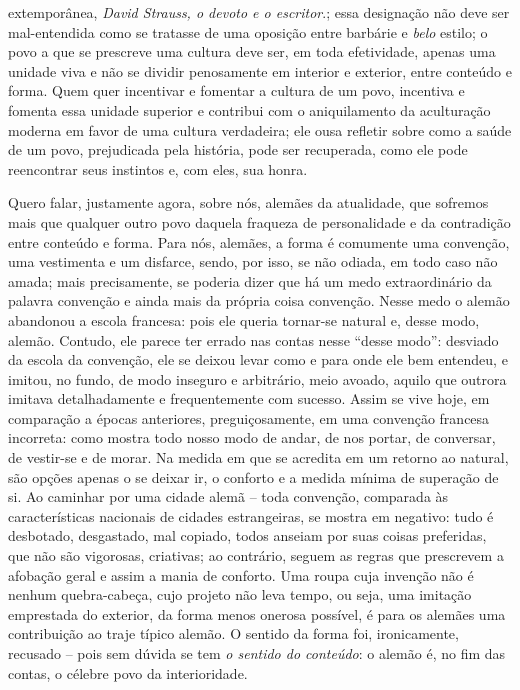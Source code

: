 \begin{enumerate}
\begin{enumerate}
{      extemporânea, \emph{David Strauss, o devoto e o escritor}.}; essa
    designação não deve ser mal-entendida como se tratasse de uma
    oposição entre barbárie e \emph{belo} estilo; o povo a que se
    prescreve uma cultura deve ser, em toda efetividade, apenas uma
    unidade viva e não se dividir penosamente em interior e exterior,
    entre conteúdo e forma. Quem quer incentivar e fomentar a cultura de
    um povo, incentiva e fomenta essa unidade superior e contribui com o
    aniquilamento da aculturação moderna em favor de uma cultura
    verdadeira; ele ousa refletir sobre como a saúde de um povo,
    prejudicada pela história, pode ser recuperada, como ele pode
    reencontrar seus instintos e, com eles, sua honra.

    Quero falar, justamente agora, sobre nós, alemães da atualidade, que
    sofremos mais que qualquer outro povo daquela fraqueza de
    personalidade e da contradição entre conteúdo e forma. Para nós,
    alemães, a forma é comumente uma convenção, uma vestimenta e um
    disfarce, sendo, por isso, se não odiada, em todo caso não amada;
    mais precisamente, se poderia dizer que há um medo extraordinário da
    palavra convenção e ainda mais da própria coisa convenção. Nesse
    medo o alemão abandonou a escola francesa: pois ele queria tornar-se
    natural e, desse modo, alemão. Contudo, ele parece ter errado nas
    contas nesse ``desse modo'': desviado da escola da convenção, ele se
    deixou levar como e para onde ele bem entendeu, e imitou, no fundo,
    de modo inseguro e arbitrário, meio avoado, aquilo que outrora
    imitava detalhadamente e frequentemente com sucesso. Assim se vive
    hoje, em comparação a épocas anteriores, preguiçosamente, em uma
    convenção francesa incorreta: como mostra todo nosso modo de andar,
    de nos portar, de conversar, de vestir-se e de morar. Na medida em
    que se acredita em um retorno ao natural, são opções apenas o se
    deixar ir, o conforto e a medida mínima de superação de si. Ao
    caminhar por uma cidade alemã -- toda convenção, comparada às
    características nacionais de cidades estrangeiras, se mostra em
    negativo: tudo é desbotado, desgastado, mal copiado, todos anseiam
    por suas coisas preferidas, que não são vigorosas, criativas; ao
    contrário, seguem as regras que prescrevem a afobação geral e assim
    a mania de conforto. Uma roupa cuja invenção não é nenhum
    quebra-cabeça, cujo projeto não leva tempo, ou seja, uma imitação
    emprestada do exterior, da forma menos onerosa possível, é para os
    alemães uma contribuição ao traje típico alemão. O sentido da forma
    foi, ironicamente, recusado -- pois sem dúvida se tem \emph{o
    sentido do conteúdo}: o alemão é, no fim das contas, o célebre povo
    da interioridade.


\end{enumerate}
\end{enumerate}
